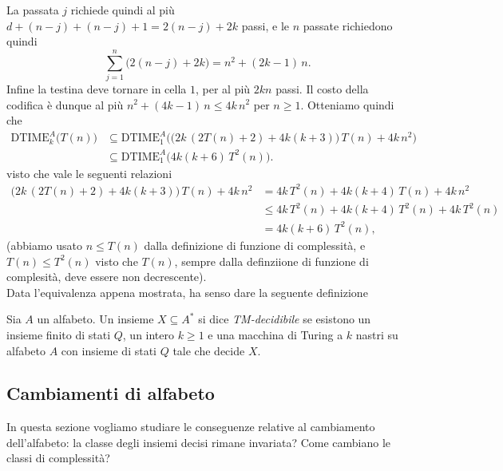 La passata $j$ richiede quindi al più $d + (n-j) + (n-j)+1= 2(n-j)+2k$ passi, e le $n$ passate
richiedono quindi
\[
  \sum_{j=1}^{n}\big(2(n-j)+2k\big) = n^2 + (2k-1)\,n .
\]
Infine la testina deve tornare in cella $1$, per al più $2kn$ passi. Il costo della
codifica è dunque al più $n^2 + (4k-1)\,n \leq 4k\,n^2$ per $n \geq 1$.
Otteniamo quindi che
\begin{equation}\label{rel:complessita-piu-nastri-un-nastro}
\begin{aligned}
  \mathrm{DTIME}^A_k\big(T(n)\big) &\subseteq
  \mathrm{DTIME}^A_1\Big(\big(2k\,(2T(n)+2) + 4k(k+3)\big)\,T(n) + 4k\,n^2\Big) \\
  &\subseteq
  \mathrm{DTIME}^A_1\big(4k(k+6)\,T^2(n)\big).
\end{aligned}
\end{equation}
visto che vale le seguenti relazioni
\begin{align*}
  \big(2k\,(2T(n)+2) + 4k(k+3)\big)\,T(n) + 4k\,n^2
  &= 4k\,T^2(n) + 4k(k+4)\,T(n) + 4k\,n^2 \\
  &\leq 4k\,T^2(n) + 4k(k+4)\,T^2(n) + 4k\,T^2(n) \\
  &= 4k(k+6)\,T^2(n),
\end{align*}
(abbiamo usato $n\leq T(n)$ dalla definizione di funzione di complessità, e $T(n)\leq T^2(n)$
visto che $T(n)$,
sempre dalla definziione di funzione di complesità, deve essere non decrescente).
\noindent
\\
Data l'equivalenza appena mostrata, ha senso dare
la seguente definizione
\begin{defi}
Sia $A$ un alfabeto. Un insieme $X \subseteq A^*$ si dice \emph{TM-decidibile} se esistono un insieme finito di stati $Q$, un intero $k \ge 1$ e una macchina di Turing a $k$ nastri su alfabeto $A$ con insieme di stati $Q$ tale che decide $X$.
\end{defi}

\subsection{Cambiamenti di alfabeto}
In questa sezione vogliamo studiare le conseguenze relative al cambiamento dell'alfabeto: la classe degli insiemi decisi rimane invariata? Come cambiano le classi di complessità?

